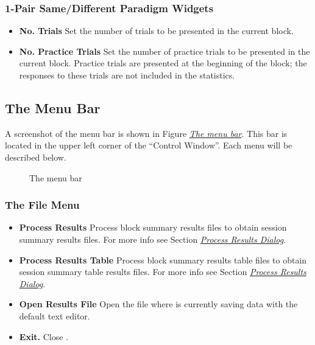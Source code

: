 \documentclass[a4paper,12pt,english]{sphinxmanual}
\begin{document}
\subsubsection{1-Pair Same/Different Paradigm Widgets}
\label{graphical_user_interface:pair-same-different-paradigm-widgets}\begin{itemize}
\item {} 
\textbf{No. Trials} Set the number of trials to be presented in the
current block.

\item {} 
\textbf{No. Practice Trials} Set the number of practice trials to be
presented in the current block. Practice trials are presented at the
beginning of the block; the responses to these trials are not
included in the statistics.

\end{itemize}


\subsection{The Menu Bar}
\label{graphical_user_interface:the-menu-bar}
A screenshot of the menu bar is shown in Figure {\hyperref[graphical_user_interface:fig-menu-bar]{\emph{The menu bar}}}. This bar
is located in the upper left corner of the “Control Window”. Each menu
will be described below.
\begin{figure}[htbp]
\centering
\capstart

\caption{The menu bar}\label{graphical_user_interface:fig-menu-bar}\end{figure}


\subsubsection{The File Menu}
\label{graphical_user_interface:the-file-menu}\begin{itemize}
\item {} 
\textbf{Process Results} Process block summary results files to obtain
session summary results files. For more info see
Section {\hyperref[graphical_user_interface:sec-process-results-dialog]{\emph{Process Results Dialog}}}.

\item {} 
\textbf{Process Results Table} Process block summary results table files
to obtain session summary table results files. For more info see
Section  {\hyperref[graphical_user_interface:sec-process-results-dialog]{\emph{Process Results Dialog}}}.

\item {} 
\textbf{Open Results File} Open the file where  is
currently saving data with the default text editor.

\item {} 
\textbf{Exit.} Close .

\end{itemize}
\end{document}
